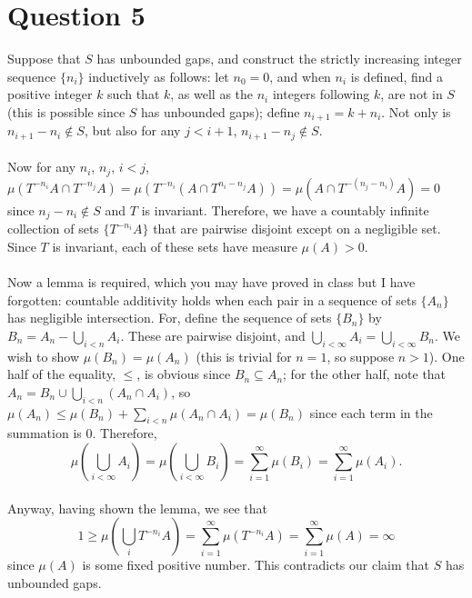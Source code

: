 \documentclass[10pt,a4paper]{article}
\begin{document}
\section*{Question 5}
Suppose that $S$ has unbounded gaps, and construct the strictly increasing integer sequence $\{n_i\}$ inductively as follows: let $n_0=0$, and when $n_i$ is defined, find a positive integer $k$ such that $k$, as well as the $n_i$ integers following $k$, are not in $S$ (this is possible since $S$ has unbounded gaps); define $n_{i+1}=k+n_i$. Not only is $n_{i+1}-n_i\notin S$, but also for any $j<i+1$, $n_{i+1}-n_j\notin S$.\\\\
Now for any $n_i$, $n_j$, $i<j$, $\mu(T^{-n_i}A\cap T^{{-n_j}}A)=\mu(T^{-n_i}(A\cap T^{n_i-n_j}A))=\mu(A\cap T^{-(n_j-n_i)}A)=0$ since $n_j-n_i\notin S$ and $T$ is invariant. Therefore, we have a countably infinite collection of sets $\{T^{-n_i}A\}$ that are pairwise disjoint except on a negligible set. Since $T$ is invariant, each of these sets have measure $\mu(A)>0$.\\\\
Now a lemma is required, which you may have proved in class but I have forgotten: countable additivity holds when each pair in a sequence of sets $\{A_n\}$ has negligible intersection. For, define the sequence of sets $\{B_n\}$ by $\displaystyle B_n=A_n-\bigcup_{i< n} A_i$. These are pairwise disjoint, and $\displaystyle \bigcup_{i<\infty} A_i=\bigcup_{i<\infty}B_n$. We wish to show $\mu(B_n)=\mu(A_n)$ (this is trivial for $n=1$, so suppose $n>1$). One half of the equality, $\leq$, is obvious since $B_n\subseteq A_n$; for the other half, note that $\displaystyle A_n=B_n\cup\bigcup_{i<n}(A_n\cap A_i)$, so $\displaystyle \mu(A_n)\leq\mu(B_n)+\sum_{i<n}\mu(A_n\cap A_i)=\mu(B_n)$ since each term in the summation is 0. Therefore,
$$\mu\left(\bigcup_{i<\infty}A_i\right)=\mu\left(\bigcup_{i<\infty}B_i\right)=\sum_{i=1}^\infty\mu(B_i)=\sum_{i=1}^\infty\mu(A_i).$$
\\
Anyway, having shown the lemma, we see that
$$1\geq\mu\left(\bigcup_{i}T^{-n_i}A\right)=\sum_{i=1}^\infty \mu(T^{-n_i}A)=\sum_{i=1}^\infty \mu(A)=\infty$$
since $\mu(A)$ is some fixed positive number. This contradicts our claim that $S$ has unbounded gaps.
\end{document}
